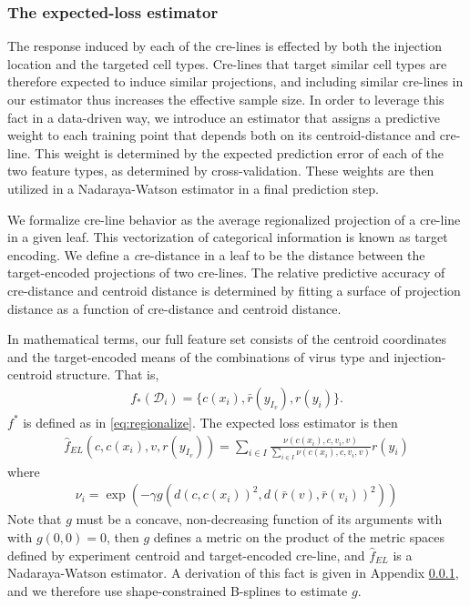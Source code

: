 \newpage
\subsubsection{The expected-loss estimator}

\label{supp_sec:el}

The response induced by each of the cre-lines is effected by both the injection location and the targeted cell types.
Cre-lines that target similar cell types are therefore expected to induce similar projections, and including similar cre-lines in our estimator thus increases the effective sample size.
In order to leverage this fact in a data-driven way, we introduce an estimator that assigns a predictive weight to each training point that depends both on its centroid-distance and cre-line.
This weight is determined by the expected prediction error of each of the two feature types, as determined by cross-validation.
These weights are then utilized in a Nadaraya-Watson estimator in a final prediction step.

%
We formalize cre-line behavior as the average regionalized projection of a cre-line in a given leaf.
This vectorization of categorical information is known as target encoding.
We define a {\textit cre-distance} in a leaf to be the distance between the target-encoded projections of two cre-lines.
The relative predictive accuracy of cre-distance and centroid distance is determined by fitting a surface of projection distance as a function of cre-distance and centroid distance. 



In mathematical terms, our full feature set consists of the centroid coordinates and the target-encoded means of the combinations of virus type and injection-centroid structure.
That is, 
\begin{eqnarray*}
f_*({\mathcal D}_i) = \{c(x_i) , \bar r(y_{I_v}), r(y_i) \}.
\end{eqnarray*}
$f^*$ is defined as in \eqref{eq:regionalize}. The expected loss estimator is then 
\begin{eqnarray*}
\hat f_{EL} (c, c(x_i),v , r(y_{I_v})) =  \sum_{i \in I} \frac{ \nu {(c(x_i) , c, v_i, v)}}{\sum_{i \in I} \nu {(c(x_i) , c, v_i, v) }} r(y_i)
\end{eqnarray*}
where
\begin{eqnarray*}
\nu_i = \exp (- \gamma g( d(c, c(x_i))^2, d(\bar r (v), \bar r (v_i))^2))
\end{eqnarray*}
Note that $g$ must be a concave, non-decreasing function of its arguments with with $g(0,0) = 0$, then $g$ defines a metric on the product of the metric spaces defined by experiment centroid and target-encoded cre-line, and $\hat f_{EL}$ is a Nadaraya-Watson estimator.  A derivation of this fact is given in Appendix \ref{supp_sec:el}, and we therefore use shape-constrained B-splines to estimate $g$.

